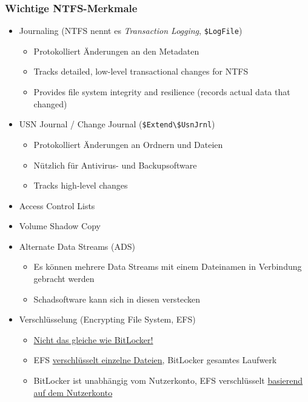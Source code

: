 \subsubsection{Wichtige NTFS-Merkmale}
\begin{itemize}
    \item Journaling (NTFS nennt es \textit{Transaction Logging}, \lstinline|$LogFile|)
    \begin{itemize}
        \item Protokolliert Änderungen an den Metadaten
        \item Tracks detailed, low-level transactional changes for NTFS
        \item Provides file system integrity and resilience (records actual data that changed)
    \end{itemize}
    \item USN Journal / Change Journal (\lstinline|$Extend\$UsnJrnl|)
    \begin{itemize}
        \item Protokolliert Änderungen an Ordnern und Dateien
        \item Nützlich für Antivirus- und Backupsoftware
        \item Tracks high-level changes
    \end{itemize}
    \item Access Control Lists
    \item Volume Shadow Copy
    \item Alternate Data Streams (ADS)
    \begin{itemize}
        \item Es können mehrere Data Streams mit einem Dateinamen in Verbindung gebracht werden
        \item Schadsoftware kann sich in diesen verstecken
    \end{itemize}
    \item Verschlüsselung (Encrypting File System, EFS)
    \begin{itemize}
        \item \underline{Nicht das gleiche wie BitLocker!}
        \item EFS \underline{verschlüsselt einzelne Dateien}, BitLocker gesamtes Laufwerk
        \item BitLocker ist unabhängig vom Nutzerkonto, EFS verschlüsselt \underline{basierend auf dem Nutzerkonto}
    \end{itemize}
\end{itemize}

